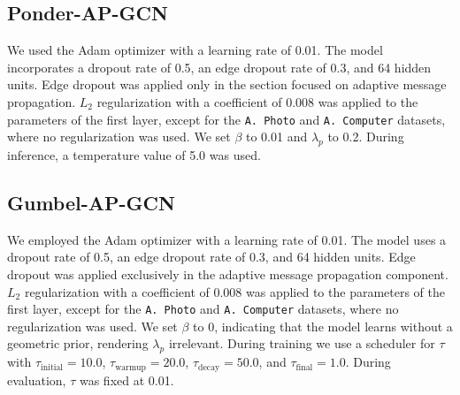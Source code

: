 \documentclass{gdl}
\begin{document}
\subsection{Ponder-AP-GCN}
\label{lab:hyper-ponder-gcn}
We used the Adam optimizer with a learning rate of 0.01. The model incorporates a dropout rate of 0.5, an edge dropout rate of 0.3, and 64 hidden units. Edge dropout was applied only in the section focused on adaptive message propagation. $L_2$ regularization with a coefficient of 0.008 was applied to the parameters of the first layer, except for the \texttt{A. Photo} and \texttt{A. Computer} datasets, where no regularization was used. We set $\beta$ to 0.01 and $\lambda_p$ to 0.2. During inference, a temperature value of 5.0 was used.

\subsection{Gumbel-AP-GCN}
\label{lab:hyper-gumbel-gcn}
We employed the Adam optimizer with a learning rate of 0.01. The model uses a dropout rate of 0.5, an edge dropout rate of 0.3, and 64 hidden units. Edge dropout was applied exclusively in the adaptive message propagation component. $L_2$ regularization with a coefficient of 0.008 was applied to the parameters of the first layer, except for the \texttt{A. Photo} and \texttt{A. Computer} datasets, where no regularization was used. We set $\beta$ to 0, indicating that the model learns without a geometric prior, rendering $\lambda_p$ irrelevant. During training we use a scheduler for $\tau$ with $\tau_{\text{initial}} = 10.0$, $\tau_{\text{warmup}} = 20.0$, $\tau_{\text{decay}} = 50.0$, and $\tau_{\text{final}} = 1.0$. During evaluation, $\tau$ was fixed at 0.01.
\end{document}
